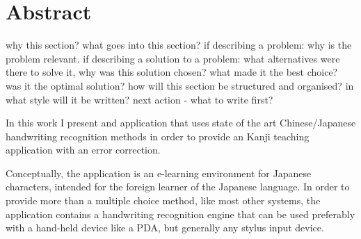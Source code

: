 
\section{Abstract}

why this section? 
what goes into this section?
  if describing a problem: why is the problem relevant.
  if describing a solution to a problem: what alternatives were
  there to solve it, why was this solution chosen? what made it the best
  choice? was it the optimal solution?
how will this section be structured and organised?
in what style will it be written?
next action - what to write first?


In this work I present and application that uses state of the art 
Chinese/Japanese handwriting recognition methods in order to provide 
an Kanji teaching application with an error correction.

Conceptually, the application is an e-learning environment for Japanese 
characters, intended for the foreign learner of the Japanese language. 
In order to provide more than a  multiple choice method, like most other 
systems, the application contains a handwriting recognition engine that can
be used preferably with a hand-held device like a PDA, but generally any 
stylus input device.

